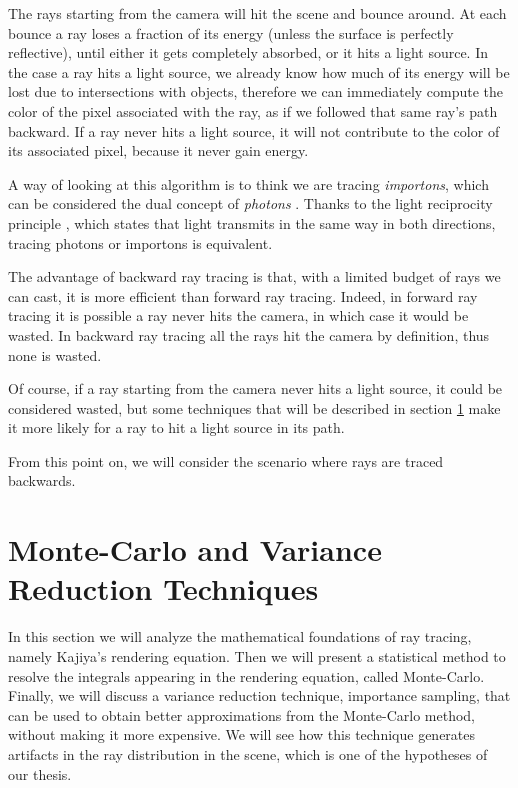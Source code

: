 \documentclass{PoliMi_MasterThesis}
\begin{document}
The rays starting from the camera will hit the scene and bounce around. At each bounce a ray loses a fraction of its energy (unless the surface is perfectly reflective), until either it gets completely absorbed, or it hits a light source. In the case a ray hits a light source, we already know how much of its energy will be lost due to intersections with objects, therefore we can immediately compute the color of the pixel associated with the ray, as if we followed that same ray's path backward. If a ray never hits a light source, it will not contribute to the color of its associated pixel, because it never gain energy.

A way of looking at this algorithm is to think we are tracing \textit{importons}, which can be considered the dual concept of \textit{photons} \cite{importons}. Thanks to the light reciprocity principle \cite{light_reciprocity}, which states that light transmits in the same way in both directions, tracing photons or importons is equivalent.

The advantage of backward ray tracing is that, with a limited budget of rays we can cast, it is more efficient than forward ray tracing. Indeed, in forward ray tracing it is possible a ray never hits the camera, in which case it would be wasted. In backward ray tracing all the rays hit the camera by definition, thus none is wasted.

Of course, if a ray starting from the camera never hits a light source, it could be considered wasted, but some techniques that will be described in section \ref{sec:monte_carlo_and_variance_reduction_techniques} make it more likely for a ray to hit a light source in its path.

From this point on, we will consider the scenario where rays are traced backwards.

\section{Monte-Carlo and Variance Reduction Techniques} \label{sec:monte_carlo_and_variance_reduction_techniques}
In this section we will analyze the mathematical foundations of ray tracing, namely Kajiya's rendering equation. Then we will present a statistical method to resolve the integrals appearing in the rendering equation, called Monte-Carlo. Finally, we will discuss a variance reduction technique, importance sampling, that can be used to obtain better approximations from the Monte-Carlo method, without making it more expensive. We will see how this technique generates artifacts in the ray distribution in the scene, which is one of the hypotheses of our thesis.
\end{document}
